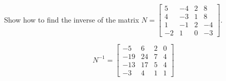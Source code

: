 
\begin{exerciseStatement}


Show how to find the inverse of the matrix \(N= \left[\begin{array}{cccc}
5 & -4 & 2 & 8 \\
4 & -3 & 1 & 8 \\
1 & -1 & 2 & -4 \\
-2 & 1 & 0 & -3
\end{array}\right] \).


\end{exerciseStatement}
    
\begin{exerciseAnswer} 
\[N^{-1}= \left[\begin{array}{cccc}
-5 & 6 & 2 & 0 \\
-19 & 24 & 7 & 4 \\
-13 & 17 & 5 & 4 \\
-3 & 4 & 1 & 1
\end{array}\right] \]
\end{exerciseAnswer}
    
